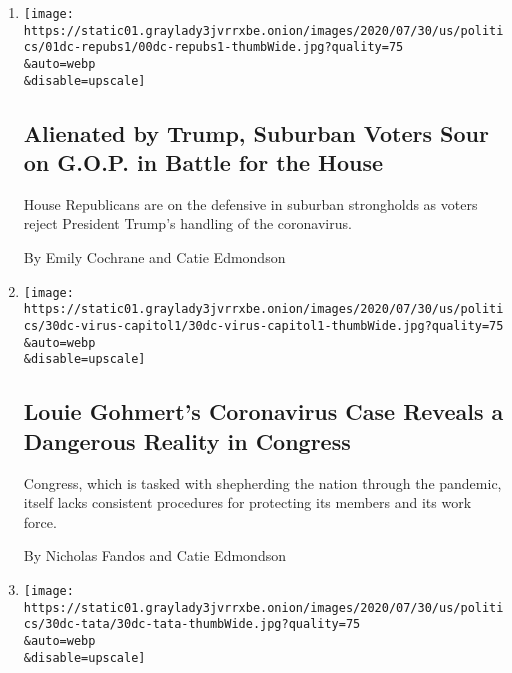 \begin{enumerate}
\def\labelenumi{\arabic{enumi}.}
\item
  \href{/2020/08/01/us/politics/trump-suburban-voters-republicans-house.html}{}

  \texttt{[image: https://static01.graylady3jvrrxbe.onion/images/2020/07/30/us/politics/01dc-repubs1/00dc-repubs1-thumbWide.jpg?quality=75\\\&auto=webp\\\&disable=upscale]}

  \hypertarget{alienated-by-trump-suburban-voters-sour-on-gop-in-battle-for-the-house}{%
  \subsection{Alienated by Trump, Suburban Voters Sour on G.O.P. in
  Battle for the
  House}\label{alienated-by-trump-suburban-voters-sour-on-gop-in-battle-for-the-house}}

  House Republicans are on the defensive in suburban strongholds as
  voters reject President Trump's handling of the coronavirus.

  By Emily Cochrane and Catie Edmondson
\item
  \href{/2020/07/30/us/politics/gohmert-coronavirus-congress.html}{}

  \texttt{[image: https://static01.graylady3jvrrxbe.onion/images/2020/07/30/us/politics/30dc-virus-capitol1/30dc-virus-capitol1-thumbWide.jpg?quality=75\\\&auto=webp\\\&disable=upscale]}

  \hypertarget{louie-gohmerts-coronavirus-case-reveals-a-dangerous-reality-in-congress}{%
  \subsection{Louie Gohmert's Coronavirus Case Reveals a Dangerous
  Reality in
  Congress}\label{louie-gohmerts-coronavirus-case-reveals-a-dangerous-reality-in-congress}}

  Congress, which is tasked with shepherding the nation through the
  pandemic, itself lacks consistent procedures for protecting its
  members and its work force.

  By Nicholas Fandos and Catie Edmondson
\item
  \href{/2020/07/30/us/politics/trump-inhofe-tata-pentagon.html}{}

  \texttt{[image: https://static01.graylady3jvrrxbe.onion/images/2020/07/30/us/politics/30dc-tata/30dc-tata-thumbWide.jpg?quality=75\\\&auto=webp\\\&disable=upscale]}

  \hypertarget{inflammatory-comments-delay-confirmation-of-retired-general-to-pentagon-post}{%
}
\end{enumerate}
